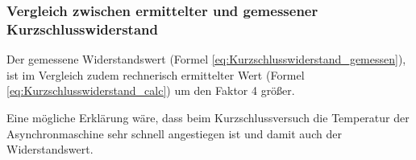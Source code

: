 \documentclass[conference]{IEEEtran}
\begin{document}
\subsubsection{Vergleich zwischen ermittelter und gemessener Kurzschlusswiderstand}

Der gemessene Widerstandswert (Formel \ref{eq:Kurzschlusswiderstand_gemessen}),
ist im Vergleich zudem rechnerisch ermittelter Wert (Formel \ref{eq:Kurzschlusswiderstand_calc}) um den Faktor 4 größer.

Eine mögliche Erklärung wäre, dass beim Kurzschlussversuch die Temperatur der
Asynchronmaschine sehr schnell angestiegen ist und damit auch der Widerstandswert.
\end{document}
